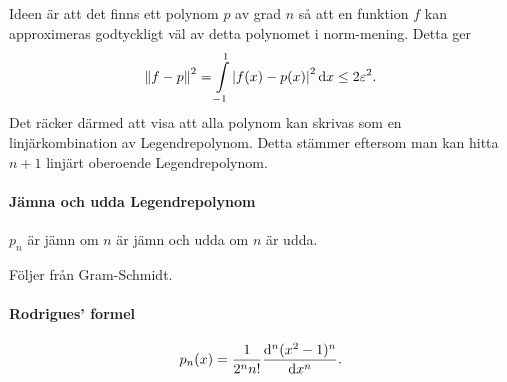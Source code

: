 \proof
Ideen är att det finns ett polynom $p$ av grad $n$ så att en funktion $f$ kan approximeras godtyckligt väl av detta polynomet i norm-mening. Detta ger
\begin{align*}
	\norm{f - p}^{2} = \int\limits_{-1}^{1}\abs{f(x) - p(x)}^{2}\dd{x} \leq 2\varepsilon^{2}.
\end{align*}
Det räcker därmed att visa att alla polynom kan skrivas som en linjärkombination av Legendrepolynom. Detta stämmer eftersom man kan hitta $n + 1$ linjärt oberoende Legendrepolynom.

\paragraph{Jämna och udda Legendrepolynom}
$p_{n}$ är jämn om $n$ är jämn och udda om $n$ är udda.

\proof
Följer från Gram-Schmidt.

\paragraph{Rodrigues' formel}
\begin{align*}
	p_{n}(x) = \frac{1}{2^{n}n!}\dv[n]{(x^{2} - 1) ^{n}}{x}.
\end{align*}

\proof

